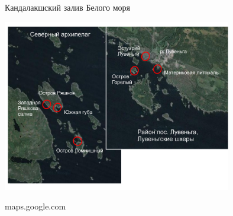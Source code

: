 \documentclass{beamer}
\begin{document}
\begin{frame}{Кандалакшский залив Белого моря}
\begin{center}
\includegraphics[width=100mm]{./white.pdf}

\tiny{maps.google.com}
\end{center}
\end{frame}



\end{document}

